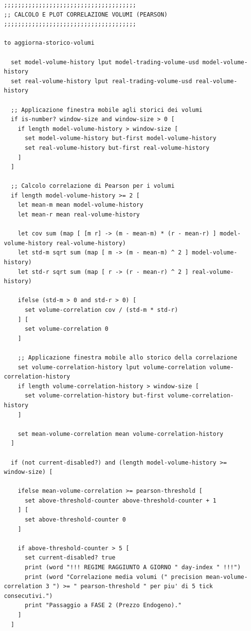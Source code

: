\begin{lstlisting}[caption={Calcolo della correlazione di Pearson sui volumi e aggiornamento del relativo plot}]
;;;;;;;;;;;;;;;;;;;;;;;;;;;;;;;;;;;;;;
;; CALCOLO E PLOT CORRELAZIONE VOLUMI (PEARSON)
;;;;;;;;;;;;;;;;;;;;;;;;;;;;;;;;;;;;;;

to aggiorna-storico-volumi

  set model-volume-history lput model-trading-volume-usd model-volume-history
  set real-volume-history lput real-trading-volume-usd real-volume-history

  ;; Applicazione finestra mobile agli storici dei volumi
  if is-number? window-size and window-size > 0 [
    if length model-volume-history > window-size [
      set model-volume-history but-first model-volume-history
      set real-volume-history but-first real-volume-history
    ]
  ]

  ;; Calcolo correlazione di Pearson per i volumi
  if length model-volume-history >= 2 [
    let mean-m mean model-volume-history
    let mean-r mean real-volume-history

    let cov sum (map [ [m r] -> (m - mean-m) * (r - mean-r) ] model-volume-history real-volume-history)
    let std-m sqrt sum (map [ m -> (m - mean-m) ^ 2 ] model-volume-history)
    let std-r sqrt sum (map [ r -> (r - mean-r) ^ 2 ] real-volume-history)

    ifelse (std-m > 0 and std-r > 0) [
      set volume-correlation cov / (std-m * std-r)
    ] [
      set volume-correlation 0
    ]

    ;; Applicazione finestra mobile allo storico della correlazione
    set volume-correlation-history lput volume-correlation volume-correlation-history
    if length volume-correlation-history > window-size [
      set volume-correlation-history but-first volume-correlation-history
    ]

    set mean-volume-correlation mean volume-correlation-history
  ]

  if (not current-disabled?) and (length model-volume-history >= window-size) [

    ifelse mean-volume-correlation >= pearson-threshold [
      set above-threshold-counter above-threshold-counter + 1
    ] [
      set above-threshold-counter 0
    ]

    if above-threshold-counter > 5 [
      set current-disabled? true
      print (word "!!! REGIME RAGGIUNTO A GIORNO " day-index " !!!")
      print (word "Correlazione media volumi (" precision mean-volume-correlation 3 ") >= " pearson-threshold " per piu' di 5 tick consecutivi.")
      print "Passaggio a FASE 2 (Prezzo Endogeno)."
    ]
  ]


\end{lstlisting}
